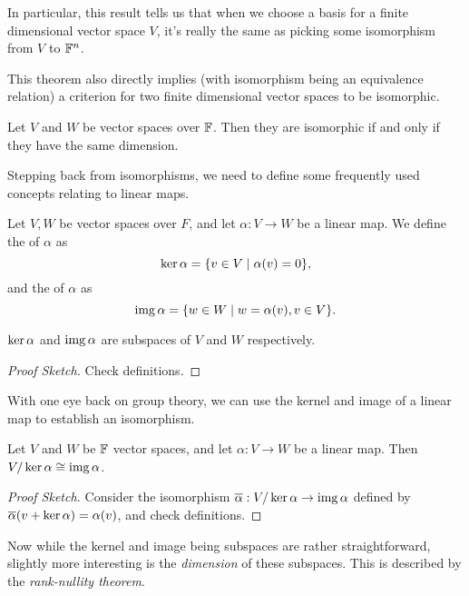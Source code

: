 \documentclass[a4paper]{scrartcl}
\begin{document}
In particular, this result tells us that when we choose a basis for a finite dimensional vector space $V$, it's really the same as picking some isomorphism from $V$ to $\mathbb{F}^n$. 

This theorem also directly implies (with isomorphism being an equivalence relation) a criterion for two finite dimensional vector spaces to be isomorphic.

\begin{theorem}
    Let $V$ and $W$ be vector spaces over $\mathbb{F}$. Then they are isomorphic if and only if they have the same dimension.
\end{theorem}

Stepping back from isomorphisms, we need to define some frequently used concepts relating to linear maps.

\begin{definition}
    Let $V, W$ be vector spaces over $F$, and let $\alpha: V \rightarrow W$ be a linear map. We define the  of $\alpha$ as
    $$
    \operatorname{ker} \alpha = \{ v\in V \mid \alpha(v) = 0\},
    $$
    and the  of $\alpha$ as
    $$
    \operatorname{img} \alpha = \{ w \in W \mid w = \alpha(v), v \in V\}.
    $$
\end{definition}

\begin{lemma}
    $\operatorname{ker} \alpha$ and $\operatorname{img} \alpha$ are subspaces of $V$ and $W$ respectively.
\end{lemma}
\begin{proof}[Proof Sketch]
    Check definitions.
\end{proof}

With one eye back on group theory, we can use the kernel and image of a linear map to establish an isomorphism.

\begin{theorem}
    Let $V$ and $W$ be $\mathbb{F}$ vector spaces, and let $\alpha: V \rightarrow W$ be a linear map. Then $V/\operatorname{ker} \alpha \cong \operatorname{img} \alpha$.
\end{theorem}
\begin{proof}[Proof Sketch]
    Consider the isomorphism $\overline{\alpha} : V/\operatorname{ker} \alpha \rightarrow \operatorname{img} \alpha$ defined by $\overline{\alpha}(v + \operatorname{ker} \alpha) = \alpha(v)$, and check definitions.
\end{proof}

Now while the kernel and image being subspaces are rather straightforward, slightly more interesting is the \emph{dimension} of these subspaces. This is described by the \emph{rank-nullity theorem}.
\end{document}
